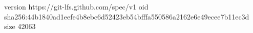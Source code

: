 version https://git-lfs.github.com/spec/v1
oid sha256:44b1840ad1eefe4b8ebc6d52423eb54bfffa550586a2162e6e49ecee7b11ec3d
size 42063
